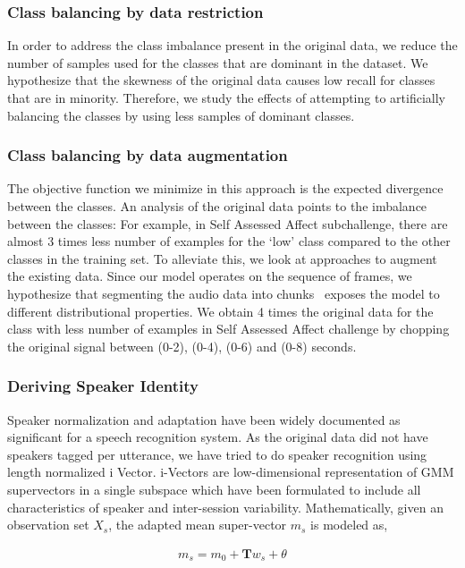 \subsubsection{Class balancing by data restriction}
In order to address the class imbalance present in the original data, we reduce the number of samples used for the classes that are dominant in the dataset. We hypothesize that the skewness of the original data causes low recall for classes that are in minority. Therefore, we study the effects of attempting to artificially balancing the classes by using less samples of dominant classes.

\subsubsection{Class balancing by data augmentation}
\label{subsec:augmentation}
The objective function we minimize in this approach is the expected divergence between the classes. An analysis of the original data points to the imbalance between the classes: For example, in Self Assessed Affect subchallenge, there are almost 3 times less number of examples for the `low' class compared to the other classes in the training set.  To alleviate this, we look at approaches to augment the existing data. Since our model operates on the sequence of frames, we hypothesize that segmenting the audio data into chunks~\cite{agrima2017detection} exposes the model to different distributional properties. We obtain 4 times the original data for the class with  less number of examples in Self Assessed Affect challenge by chopping the original signal between (0-2), (0-4), (0-6) and (0-8) seconds.

\subsubsection{Deriving Speaker Identity}
Speaker normalization and adaptation have been widely documented as significant for a speech recognition system. As the original data did not have speakers tagged per utterance, we have tried to do speaker recognition using length normalized i Vector.  i-Vectors are low-dimensional representation of GMM supervectors  in a single subspace which have been formulated to include all characteristics of speaker and inter-session variability. Mathematically, given an observation set $X_s$, the adapted mean super-vector $m_s$ is modeled as,

\begin{equation} \label{frame_replacement_basic}
\begin{split}
   m_s = m_0 + \textbf{T}w_s + \theta \\ 
\end{split}
\end{equation}

